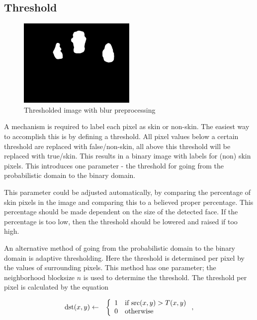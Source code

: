 \subsection*{Threshold}

\begin{figure}[tb]
    \center{}
    \includegraphics[width=0.5\textwidth]{figures/pipeline/thresholded.jpg}
	\caption{Thresholded image with blur preprocessing}
	\label{fig:threshold}
\end{figure}

A mechanism is required to label each pixel as skin or non-skin. The easiest way to accomplish this is by defining a threshold. All pixel values below a certain threshold are replaced with false/non-skin, all above this threshold will be replaced with true/skin. This results in a binary image with labels for (non) skin pixels. This introduces one parameter - the threshold for going from the probabilistic domain to the binary domain.

This parameter could be adjusted automatically, by comparing the percentage of skin pixels in the image and comparing this to a believed proper percentage. This percentage should be made dependent on the size of the detected face. If the percentage is too low, then the threshold should be lowered and raised if too high. 

An alternative method of going from the probabilistic domain to the binary domain is adaptive thresholding. Here the threshold is determined per pixel by the values of surrounding pixels. This method has one parameter; the neighborhood blocksize $n$ is used to determine the threshold. The threshold per pixel is calculated by the equation

\begin{eqnarray}
  \text{dst}(x, y) & \leftarrow & \left\{
  \begin{array}{l l}
	1 & \text{if src}(x,y) > T(x,y) \\
	0 & \text{otherwise} \\
  \end{array} \right.,
\end{eqnarray}

